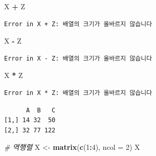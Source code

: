 \documentclass[11pt,a4paper]{book}
\newenvironment{Shaded}{\begin{snugshade}}{\end{snugshade}}
\newcommand{\KeywordTok}[1]{\textcolor[rgb]{0.13,0.29,0.53}{\textbf{#1}}}
\newcommand{\DataTypeTok}[1]{\textcolor[rgb]{0.13,0.29,0.53}{#1}}
\newcommand{\DecValTok}[1]{\textcolor[rgb]{0.00,0.00,0.81}{#1}}
\newcommand{\StringTok}[1]{\textcolor[rgb]{0.31,0.60,0.02}{#1}}
\newcommand{\CommentTok}[1]{\textcolor[rgb]{0.56,0.35,0.01}{\textit{#1}}}
\newcommand{\OperatorTok}[1]{\textcolor[rgb]{0.81,0.36,0.00}{\textbf{#1}}}
\newcommand{\NormalTok}[1]{#1}
\theoremstyle{definition}
\theoremstyle{definition}
\theoremstyle{definition}
\theoremstyle{remark}
\begin{document}
\begin{Shaded}
\begin{Highlighting}[]
\NormalTok{X }\OperatorTok{+}\StringTok{ }\NormalTok{Z}
\end{Highlighting}
\end{Shaded}

\begin{verbatim}
Error in X + Z: 배열의 크기가 올바르지 않습니다
\end{verbatim}

\begin{Shaded}
\begin{Highlighting}[]
\NormalTok{X }\OperatorTok{-}\StringTok{ }\NormalTok{Z}
\end{Highlighting}
\end{Shaded}

\begin{verbatim}
Error in X - Z: 배열의 크기가 올바르지 않습니다
\end{verbatim}

\begin{Shaded}
\begin{Highlighting}[]
\NormalTok{X }\OperatorTok{*}\StringTok{ }\NormalTok{Z}
\end{Highlighting}
\end{Shaded}

\begin{verbatim}
Error in X * Z: 배열의 크기가 올바르지 않습니다
\end{verbatim}

\begin{Shaded}
\end{Shaded}

\begin{verbatim}
      A  B   C
[1,] 14 32  50
[2,] 32 77 122
\end{verbatim}

\begin{Shaded}
\begin{Highlighting}[]
\CommentTok{# 역행렬}
\NormalTok{X <-}\StringTok{ }\KeywordTok{matrix}\NormalTok{(}\KeywordTok{c}\NormalTok{(}\DecValTok{1}\OperatorTok{:}\DecValTok{4}\NormalTok{), }\DataTypeTok{ncol =} \DecValTok{2}\NormalTok{)}
\NormalTok{X}
\end{Highlighting}
\end{Shaded}
\end{document}

